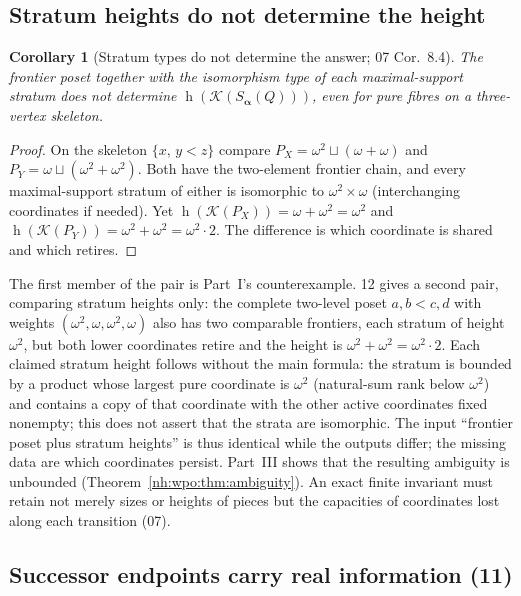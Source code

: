 \documentclass[11pt,a4paper]{article}
\newtheorem{corollary}[theorem]{Corollary}
\theoremstyle{definition}
\theoremstyle{remark}
\newcommand{\K}{\mathcal K}
\newcommand{\hgt}{\operatorname{h}}
\begin{document}
\subsection{Stratum heights do not determine the height}

\begin{corollary}[Stratum types do not determine the answer; 07 Cor.~8.4]
\label{nh:cor:strata}
The frontier poset together with the isomorphism type of each maximal-support
stratum does not determine $\hgt(\K(S_{\boldsymbol\alpha}(Q)))$, even for pure
fibres on a three-vertex skeleton.
\end{corollary}
\begin{proof}
On the skeleton $\{x,\,y<z\}$ compare $P_X=\omega^2\sqcup(\omega+\omega)$ and
$P_Y=\omega\sqcup(\omega^2+\omega^2)$. Both have the two-element frontier chain,
and every maximal-support stratum of either is isomorphic to
$\omega^2\times\omega$ (interchanging coordinates if needed). Yet
$\hgt(\K(P_X))=\omega+\omega^2=\omega^2$ and
$\hgt(\K(P_Y))=\omega^2+\omega^2=\omega^2\cdot2$. The difference is which
coordinate is shared and which retires.
\end{proof}

The first member of the pair is Part~I's counterexample. 12 gives a second
pair, comparing stratum heights only: the complete two-level poset $a,b<c,d$ with
weights $(\omega^2,\omega,\omega^2,\omega)$ also has two comparable frontiers,
each stratum of height $\omega^2$, but both lower coordinates retire and the
height is $\omega^2+\omega^2=\omega^2\cdot2$. Each claimed stratum height
follows without the main formula: the stratum is bounded by a product whose
largest pure coordinate is $\omega^2$ (natural-sum rank below $\omega^2$) and
contains a copy of that coordinate with the other active coordinates fixed
nonempty; this does not assert that the strata are isomorphic. The input
``frontier poset plus stratum heights'' is thus identical while the outputs
differ; the missing data are which coordinates persist. Part~III shows that
the resulting ambiguity is unbounded (Theorem~\ref{nh:wpo:thm:ambiguity}). An
exact finite invariant must retain not merely sizes or heights of pieces but the
capacities of coordinates lost along each transition (07).

\subsection{Successor endpoints carry real information (11)}
\end{document}
